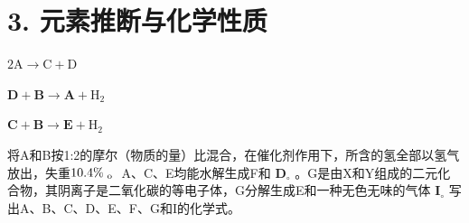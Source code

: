 \section*{3. 元素推断与化学性质}
$
2 \mathrm{A} \rightarrow \mathrm{C} + \mathrm{D}\tag{1}
$

$
\mathbf {D} + \mathbf {B} \rightarrow \mathbf {A} + \mathrm{H} _ {2}\tag{2}
$

$
\mathbf {C} + \mathbf {B} \rightarrow \mathbf {E} + \mathrm{H} _ {2}\tag{3}
$

将A和B按1:2的摩尔（物质的量）⽐混合，在催化剂作⽤下，所含的氢全部以氢⽓放出，失重$1 0 . 4 \% _ { \textmd { o } }$ A、C、E均能⽔解⽣成F和 $\mathbf { D } _ { \circ }$ 。G是由X和Y组成的⼆元化合物，其阴离⼦是⼆氧化碳的等电⼦体，G分解⽣成E和⼀种⽆⾊⽆味的⽓体 $\mathbf { I } _ { \circ }$ 写出A、B、C、D、E、F、G和I的化学式。
